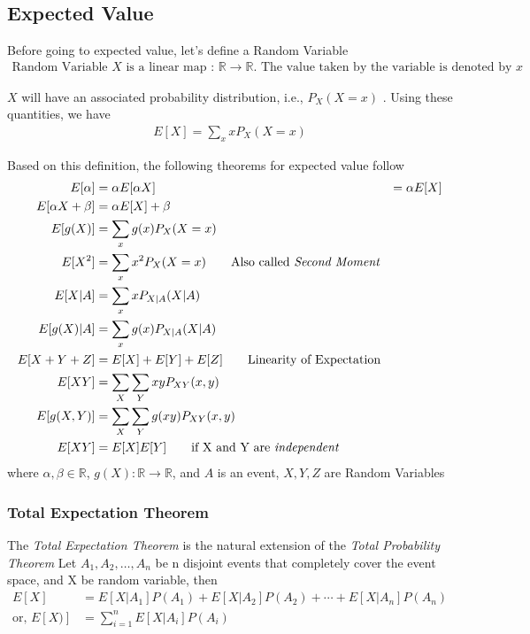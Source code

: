 \documentclass[11pt, a4paper]{article}
\begin{document}
    \subsection{Expected Value}
    Before going to expected value, let's define a Random Variable
    \begin{align*}
        \text{Random Variable } X \text{ is a linear map : } \mathbb{R} \to \mathbb{R} \text{. The value taken by the variable is denoted by } x
    \end{align*}
    
    $X$ will have an associated probability distribution, i.e., $P_{X}(X = x)$ . Using these quantities, we have
    \begin{align*}
        E[X] = \sum_x xP_{X}(X = x) \tag*{Expected Value}
    \end{align*}

    Based on this definition, the following theorems for expected value follow
    \begin{align*}
        E[\alpha] &= \alpha
        E[\alpha X] &= \alpha E[X] \\
        E[\alpha X + \beta] &= \alpha E[X] + \beta \\
        E[g(X)] &= \sum_x g(x)P_{X}(X = x) \\
        E[X^{2}] &= \sum_x x^{2} P_{X}(X = x) \tag*{Also called \emph{Second Moment}}\\
        E[X|A] &= \sum_{x} x P_{X|A}(X|A) \\
        E[g(X)|A] &= \sum_{x} g(x) P_{X|A}(X|A) \\
        E[X + Y + Z] &= E[X] + E[Y] + E[Z] \tag*{Linearity of Expectation}\\
        E[XY] &= \sum_{X} \sum_{Y} xy P_{XY}(x,y) \\
        E[g(X,Y)] &= \sum_{X} \sum_{Y} g(xy) P_{XY}(x,y) \\
        E[XY] &= E[X]E[Y] \tag*{if X and Y are \emph{independent}}
    \end{align*}
    where $\alpha, \beta \in \mathbb{R}$, $g(X) : \mathbb{R} \rightarrow \mathbb{R}$, and $A$ is an event, $X, Y, Z$ are Random Variables

    \subsubsection{Total Expectation Theorem}
    The \emph{Total Expectation Theorem} is the natural extension of the \emph{Total Probability Theorem}
    Let $A_{1}, A_{2}, \ldots, A_{n}$ be n disjoint events that completely cover the event space, and X be random variable, then
    \begin{align*}
        E[X] &= E[X|A_{1}]P(A_{1}) + E[X|A_{2}]P(A_{2}) + \cdots + E[X|A_{n}]P(A_{n})\\
        \text{or, } E[X)] &= \sum_{i=1}^{n} E[X|A_{i}]P(A_{i})
    \end{align*}
\end{document}
